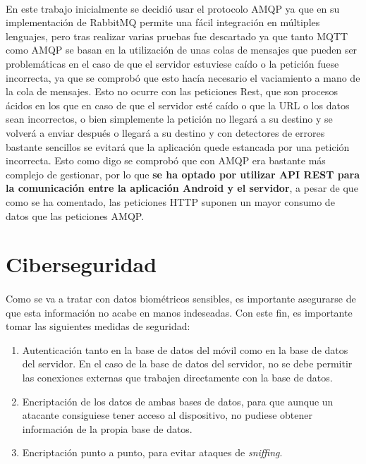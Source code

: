 \paragraph{}
En este trabajo inicialmente se decidió usar el protocolo AMQP ya que en su implementación de RabbitMQ permite una fácil integración en múltiples lenguajes, pero tras realizar varias pruebas fue descartado ya que tanto MQTT como AMQP se basan en la utilización de unas colas de mensajes que pueden ser problemáticas en el caso de que el servidor estuviese caído o la petición fuese incorrecta, ya que se comprobó que esto hacía necesario el vaciamiento a mano de la cola de mensajes. Esto no ocurre con las peticiones Rest, que son procesos ácidos en los que en caso de que el servidor esté caído o que la URL o los datos sean incorrectos, o bien simplemente la petición no llegará a su destino y se volverá a enviar después o llegará a su destino y con detectores de errores bastante sencillos se evitará que la aplicación quede estancada por una petición incorrecta. Esto como digo se comprobó que con AMQP era bastante más complejo de gestionar, por lo que \textbf{se ha optado por utilizar API REST para la comunicación entre la aplicación Android y el servidor}, a pesar de que como se ha comentado, las peticiones HTTP suponen un mayor consumo de datos que las peticiones AMQP.

\section{Ciberseguridad}
\label{sec:ciber}
\paragraph{}
Como se va a tratar con datos biométricos sensibles, es importante asegurarse de que esta información no acabe en manos indeseadas. Con este fin, es importante tomar las siguientes medidas de seguridad:
\begin{enumerate}
\item Autenticación tanto en la base de datos del móvil como en la base de datos del servidor. En el caso de la base de datos del servidor, no se debe permitir las conexiones externas que trabajen directamente con la base de datos.
\item Encriptación de los datos de ambas bases de datos, para que aunque un atacante consiguiese tener acceso al dispositivo, no pudiese obtener información de la propia base de datos.
\item Encriptación punto a punto, para evitar ataques de \textit{sniffing}.
\end{enumerate}

